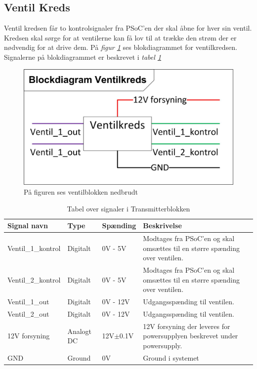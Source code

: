 \subsection{Ventil Kreds}
Ventil kredsen får to kontrolsignaler fra PSoC'en der skal åbne for hver sin ventil. Kredsen skal sørge for at ventilerne kan få lov til at trække den strøm der er nødvendig for at drive dem. På \textit{figur \ref{fig:ventilblok}} ses blokdiagrammet for ventilkredsen. Signalerne på blokdiagrammet er beskrevet i \textit{tabel \ref{table:ventrilkreds}}
\begin{figure}[H]
\centering
\includegraphics[scale=1]{billeder/ventilblok}
\caption{På figuren ses ventilblokken nedbrudt}
\label{fig:ventilblok}
\end{figure}
\begin{table}[H]
\begin{tabular}{|p{3cm}|p{3cm}|p{3cm}|p{4.5cm}|} \hline
\cellcolor[gray]{0.85}Signal navn& \cellcolor[gray]{0.85}Type &\cellcolor[gray]{0.85}Spænding&\cellcolor[gray]{0.85}Beskrivelse\\ \hline
Ventil\_1\_kontrol & Digitalt & 0V - 5V & Modtages fra PSoC'en og skal omsættes til en større spænding over ventilen.\\ \hline
Ventil\_2\_kontrol & Digitalt & 0V - 5V & Modtages fra PSoC'en og skal omsættes til en større spænding over ventilen.\\ \hline
Ventil\_1\_out & Digitalt & 0V - 12V & Udgangsspænding til ventilen.\\ \hline
Ventil\_2\_out & Digitalt & 0V - 12V & Udgangsspænding til ventilen.\\ \hline
12V forsyning & Analogt DC & 12V$\pm$0.1V & 12V forsyning der leveres for powersupplyen beskrevet under powersupply.\\ \hline
GND & Ground & 0V & Ground i systemet \\ \hline
\end{tabular}
\caption{Tabel over signaler i Transmitterblokken}
\label{table:ventrilkreds}
\end{table}
\newpage
